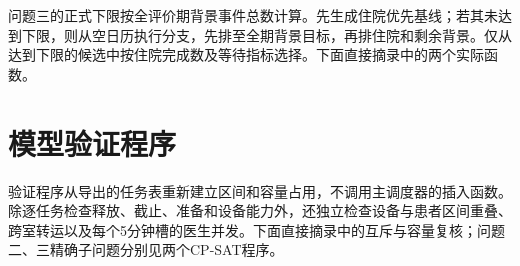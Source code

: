 问题三的正式下限按全评价期背景事件总数计算。先生成住院优先基线；若其未达到下限，则从空日历执行分支，先排至全期背景目标，再排住院和剩余背景。仅从达到下限的候选中按住院完成数及等待指标选择。下面直接摘录中的两个实际函数。





\section{模型验证程序}

验证程序从导出的任务表重新建立区间和容量占用，不调用主调度器的插入函数。除逐任务检查释放、截止、准备和设备能力外，还独立检查设备与患者区间重叠、跨室转运以及每个5分钟槽的医生并发。下面直接摘录中的互斥与容量复核；问题二、三精确子问题分别见两个CP-SAT程序。


